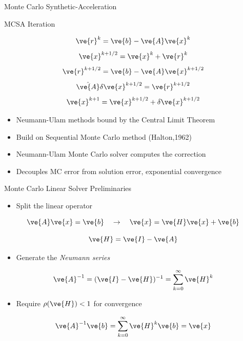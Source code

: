 \documentclass{beamer}
\begin{document}
\begin{frame}{Monte Carlo Synthetic-Acceleration}

  \begin{beamerboxesrounded}[upper=boxheadcolor,lower=boxbodycolor,shadow=true]
    {MCSA Iteration}

    \[
    \ve{r}^{k} = \ve{b} - \ve{A}\ve{x}^{k}
    \]
    \[
    \ve{x}^{k+1/2} = \ve{x}^k + \ve{r}^k
    \]
    \[
    \ve{r}^{k+1/2} = \ve{b} - \ve{A}\ve{x}^{k+1/2}
    \]
    \[
    \hat{\ve{A}}\delta\ve{x}^{k+1/2} = \ve{r}^{k+1/2}
    \]
    \[
    \ve{x}^{k+1} = \ve{x}^{k+1/2} + \delta \ve{x}^{k+1/2}
    \]

  \end{beamerboxesrounded}

  \medskip \medskip
  \begin{itemize}
  \item Neumann-Ulam methods bound by the Central Limit Theorem
  \item Build on Sequential Monte Carlo method (Halton,1962)
  \item Neumann-Ulam Monte Carlo solver computes the correction
  \item Decouples MC error from solution error, exponential convergence
  \end{itemize}

\end{frame}

\begin{frame}{Monte Carlo Linear Solver Preliminaries}

  \begin{itemize}
  \item Split the linear operator
  \end{itemize}

  \[
  \ve{A}\ve{x} = \ve{b} \ \ \ \rightarrow \ \ \ \ve{x} = \ve{H} \ve{x}
  + \ve{b}
  \]

  \[
  \ve{H} = \ve{I} - \ve{A}
  \]

  \medskip
  \begin{itemize}
  \item Generate the \textit{Neumann series}
  \end{itemize}
  
  \[
  \ve{A}^{-1} = (\ve{I}-\ve{H})^{-1} = \sum_{k=0}^{\infty} \ve{H}^k
  \]

  \medskip
  \begin{itemize}
  \item Require $\rho(\ve{H}) < 1$ for convergence
  \end{itemize}

  \[
  \ve{A}^{-1}\ve{b} = \sum_{k=0}^{\infty} \ve{H}^k\ve{b} = \ve{x}
  \]

\end{frame}
\end{document}
